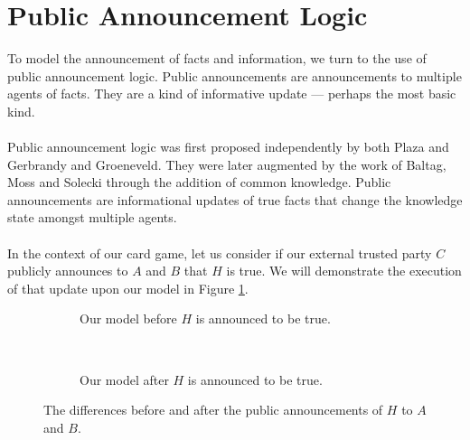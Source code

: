 \documentclass[12pt, a4paper, titlepage]{scrartcl}
\begin{document}
\section{Public Announcement Logic}\label{pal}
To model the announcement of facts and information, we turn to the use of public
announcement logic.
Public announcements are announcements to multiple agents of facts.
They are a kind of informative update --- perhaps the most basic kind.\\
\\
Public announcement logic was first proposed independently by both Plaza and
Gerbrandy and Groeneveld. \citep{plaza2007public,gelbrandy1997reasoning}
They were later augmented by the work of Baltag, Moss and Solecki through the
addition of common knowledge. \citep{baltag1998lpa}
Public announcements are informational updates of true facts that change the
knowledge state amongst multiple agents.\\
\\
In the context of our card game, let us consider if our external trusted party
$C$ publicly announces to $A$ and $B$ that $H$ is true.
We will demonstrate the execution of that update upon our model in Figure
\ref{pakripkefigure}.
\begin{figure}[ht!]
\centering
\begin{subfigure}[b]{.45\textwidth}
\centering
{}
\caption{Our model before $H$ is announced to be true.}
\end{subfigure}
~
\begin{subfigure}[b]{.45\textwidth}
\centering
{}
\caption{Our model after $H$ is announced to be true.}
\end{subfigure}
\caption{The differences before and after the public announcements of $H$ to $A$ and
	$B$.}
\label{pakripkefigure}
\end{figure}
\end{document}
